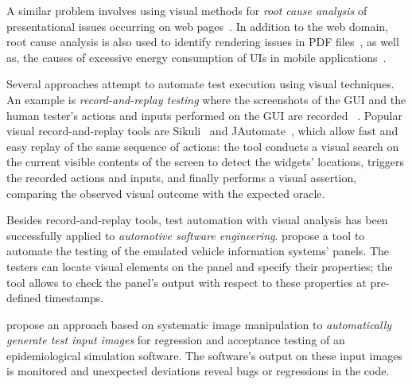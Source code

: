 A similar problem involves using visual methods for 
\textit{root cause analysis} of presentational issues 
occurring on web pages~\cite{Mahajan-2014-ASE, Mahajan-2015-ICST,
Mahajan-2016-ICST}.
In addition to the web domain, root cause analysis 
is also used to identify rendering issues in PDF 
files~\cite{Kuchta-2018-EMSE}, as well as, the causes
of excessive energy consumption of UIs in mobile 
applications~\cite{Wan-2017-STVR}.

Several approaches attempt to automate test 
execution using visual techniques. An example 
is \textit{record-and-replay testing} where the 
screenshots of the GUI and the human tester's 
actions and inputs performed on the GUI are recorded~\cite{Chang-2010-CHI,
Alegroth-2013-ICST, Lin-2014-TSE, He-2016-ICWS} . 
Popular visual record-and-replay tools are 
Sikuli~\cite{Chang-2010-CHI} and 
JAutomate~\cite{Alegroth-2013-ICST}, which allow 
fast and easy replay of the same sequence of actions:
the tool conducts a visual search on the current 
visible contents of the screen to detect the 
widgets' locations, triggers the recorded 
actions and inputs, and finally performs a visual assertion,
comparing the observed visual outcome with the expected oracle.

Besides record-and-replay tools, test automation with 
visual analysis has been successfully applied to 
\textit{automotive software engineering}. 
\citet{Amalfitano-2014-WISE} propose a tool to automate 
the testing of the emulated vehicle information 
systems' panels.
The testers can locate visual elements on the panel 
and specify their properties; the tool allows to 
check the panel's output with respect to these 
properties at pre-defined timestamps.


\citet{Patric-2016-ASE} propose an approach based 
on systematic image manipulation to \textit{automatically 
generate test input images} for regression and 
acceptance testing of an epidemiological simulation software.
The software's output on these input images is 
monitored and unexpected deviations reveal bugs or regressions in the code.

